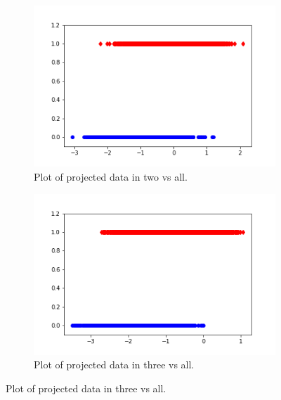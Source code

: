 \documentclass[12pt]{article}%
\numberwithin{equation}{subsection}
\begin{document}
\begin{figure}[H]
    \begin{subfigure}[b]{0.5\linewidth}
        \centering
        \includegraphics[width=\linewidth]{images/fig2.png}
        \caption{Plot of projected data in two vs all.}
        \label{fig2:a}
        \vspace{4ex}
    \end{subfigure}%
    \begin{subfigure}[b]{0.5\linewidth}
        \centering
        \includegraphics[width=\linewidth]{images/fig3.png}
        \caption{Plot of projected data in three vs all.}
        \label{fig2:a}
        \vspace{4ex}
    \end{subfigure}%
    
    
    

\end{figure}
\end{document}
